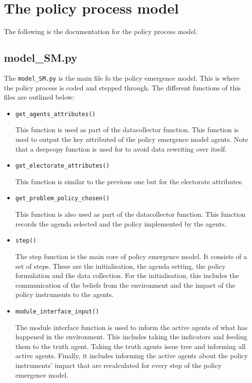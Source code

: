 \section{The policy process model}
\label{sec:documentationPolicy}

The following is the documentation for the policy process model.

\subsection{model\_SM.py}

The \texttt{model\_SM.py} is the main file fo the policy emergence model. This is where the policy process is coded and stepped through. The different functions of this files are outlined below:

\begin{itemize}
\item \texttt{get\_agents\_attributes()}

This function is used as part of the datacollector function. This function is used to output the key attributed of the policy emergence model agents. Note that a deepcopy function is used for to avoid data rewriting over itself.

\item \texttt{get\_electorate\_attributes()}

This function is similar to the previous one but for the electorate attributes.

\item \texttt{get\_problem\_policy\_chosen()}

This function is also used as part of the datacollector function. This function records the agenda selected and the policy implemented by the agents.

\item \texttt{step()}

The step function is the main core of policy emergence model. It consists of a set of steps. These are the initialisation, the agenda setting, the policy formulation and the data collection. For the initialisation, this includes the communication of the beliefs from the environment and the impact of the policy instruments to the agents.

\item \texttt{module\_interface\_input()}

The module interface function is used to inform the active agents of what has happened in the environment. This includes taking the indicators and feeding them to the truth agent. Taking the truth agents issue tree and informing all active agents. Finally, it includes informing the active agents about the policy instruments' impact that are recalculated for every step of the policy emergence model.


\end{itemize}
